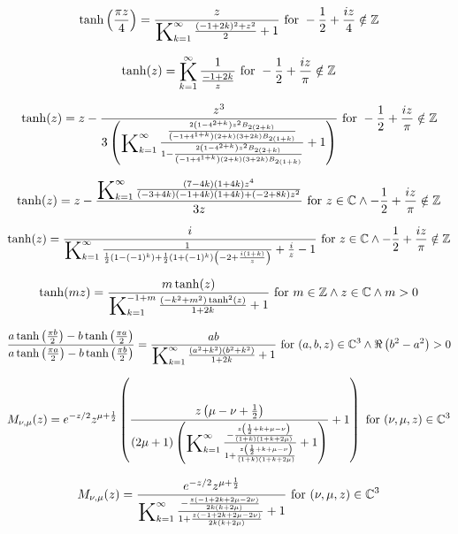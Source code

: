 \documentclass{article}
\newcommand{\bigK}{\mathop{\raisebox{-5pt}{\huge K}}}
\begin{document}
\[\tanh \left(\frac{\pi  z}{4}\right)=\frac{z}{\bigK_{k=1}^{\infty}\frac{(-1+2 k)^2+z^2}{2}+1}\text{ for }-\frac{1}{2}+\frac{i z}{4}\notin \mathbb{Z}\] 

\[\tanh (z)=\bigK_{k=1}^{\infty}\frac{1}{\frac{-1+2 k}{z}}\text{ for }-\frac{1}{2}+\frac{i z}{\pi }\notin \mathbb{Z}\] 

\[\tanh (z)=z-\frac{z^3}{3 \left(\bigK_{k=1}^{\infty}\frac{\frac{2 \left(1-4^{2+k}\right) z^2 B_{2 (2+k)}}{\left(-1+4^{1+k}\right) (2+k) (3+2 k) B_{2 (1+k)}}}{1-\frac{2 \left(1-4^{2+k}\right) z^2 B_{2 (2+k)}}{\left(-1+4^{1+k}\right) (2+k) (3+2 k) B_{2 (1+k)}}}+1\right)}\text{ for }-\frac{1}{2}+\frac{i z}{\pi }\notin \mathbb{Z}\] 

\[\tanh (z)=z-\frac{\bigK_{k=1}^{\infty}\frac{(7-4 k) (1+4 k) z^4}{(-3+4 k) (-1+4 k) (1+4 k)+(-2+8 k) z^2}}{3 z}\text{ for }z\in \mathbb{C}\land -\frac{1}{2}+\frac{i z}{\pi }\notin \mathbb{Z}\] 

\[\tanh (z)=\frac{i}{\bigK_{k=1}^{\infty}\frac{1}{\frac{1}{2} \left(1-(-1)^k\right)+\frac{1}{2} \left(1+(-1)^k\right) \left(-2+\frac{i (1+k)}{z}\right)}+\frac{i}{z}-1}\text{ for }z\in \mathbb{C}\land -\frac{1}{2}+\frac{i z}{\pi }\notin \mathbb{Z}\] 

\[\tanh (m z)=\frac{m \tanh (z)}{\bigK_{k=1}^{-1+m}\frac{\left(-k^2+m^2\right) \tanh ^2(z)}{1+2 k}+1}\text{ for }m\in \mathbb{Z}\land z\in \mathbb{C}\land m>0\] 

\[\frac{a \tanh \left(\frac{\pi  b}{2}\right)-b \tanh \left(\frac{\pi  a}{2}\right)}{a \tanh \left(\frac{\pi  a}{2}\right)-b \tanh \left(\frac{\pi  b}{2}\right)}=\frac{a b}{\bigK_{k=1}^{\infty}\frac{\left(a^2+k^2\right) \left(b^2+k^2\right)}{1+2 k}+1}\text{ for }(a,b,z)\in \mathbb{C}^3\land \Re\left(b^2-a^2\right)>0\] 

\[M_{\nu ,\mu }(z)=e^{-z/2} z^{\mu +\frac{1}{2}} \left(\frac{z \left(\mu -\nu +\frac{1}{2}\right)}{(2 \mu +1) \left(\bigK_{k=1}^{\infty}\frac{-\frac{z \left(\frac{1}{2}+k+\mu -\nu \right)}{(1+k) (1+k+2 \mu )}}{1+\frac{z \left(\frac{1}{2}+k+\mu -\nu \right)}{(1+k) (1+k+2 \mu )}}+1\right)}+1\right)\text{ for }(\nu ,\mu ,z)\in \mathbb{C}^3\] 

\[M_{\nu ,\mu }(z)=\frac{e^{-z/2} z^{\mu +\frac{1}{2}}}{\bigK_{k=1}^{\infty}\frac{-\frac{z (-1+2 k+2 \mu -2 \nu )}{2 k (k+2 \mu )}}{1+\frac{z (-1+2 k+2 \mu -2 \nu )}{2 k (k+2 \mu )}}+1}\text{ for }(\nu ,\mu ,z)\in \mathbb{C}^3\] 
\end{document}
